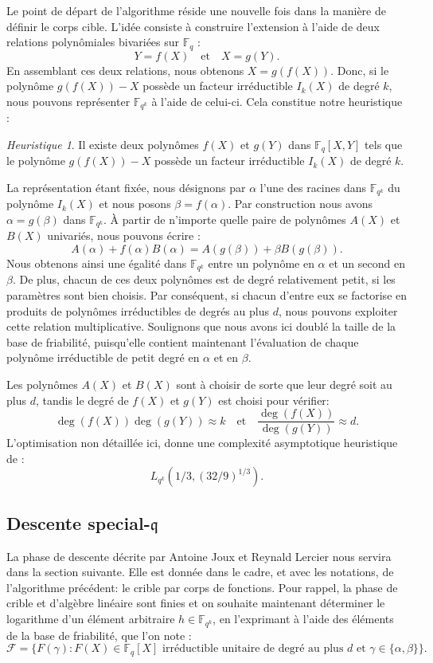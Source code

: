 \documentclass[a4paper, titlepage, 11pt]{article}
\theoremstyle{definition}
\theoremstyle{remark}
\newtheorem{heur}[theo]{Heuristique}
\def\gf #1{\mathbb{F}_{#1}}
\begin{document}
Le point de départ de l'algorithme réside une nouvelle fois dans la manière de définir le corps cible. L'idée consiste à construire l'extension à l'aide de deux relations polynômiales bivariées sur $\gf{q}$ : $$Y = f(X) \quad \text{et}\quad X = g(Y).$$
En assemblant ces deux relations, nous obtenons $X = g(f(X))$. Donc, si le polynôme $g(f(X)) - X$ possède un facteur irréductible $I_k(X)$ de degré $k$, nous pouvons représenter $\gf{q^k}$ à l'aide de celui-ci. Cela constitue notre heuristique :
\begin{heur}
Il existe deux polynômes $f(X)$ et $g(Y)$ dans $\gf{q}[X, Y]$ tels que le polynôme $g(f(X)) - X$ possède un facteur irréductible $I_k(X)$ de degré $k$.
\end{heur}
La représentation étant fixée, nous désignons par $\alpha$ l'une des racines dans $\gf{q^k}$ du polynôme $I_k(X)$ et nous posons $\beta = f(\alpha)$. Par construction nous avons $\alpha = g(\beta)$ dans $\gf{q^k}$. À partir de n'importe quelle paire de polynômes $A(X)$ et $B(X)$ univariés, nous pouvons écrire :
$$A(\alpha) + f(\alpha)B(\alpha) = A(g(\beta)) + \beta B(g(\beta)).$$
Nous obtenons ainsi une égalité dans $\gf{q^k}$ entre un polynôme en $\alpha$ et un second en $\beta$. De plus, chacun de ces deux polynômes est de degré relativement petit, si les paramètres sont bien choisis. Par conséquent, si chacun d'entre eux se factorise en produits de polynômes irréductibles de degrés au plus $d$, nous pouvons exploiter cette relation multiplicative. Soulignons que nous avons ici doublé la taille de la base de friabilité, puisqu'elle contient maintenant l'évaluation de chaque polynôme irréductible de petit degré en $\alpha$ et en $\beta$.

Les polynômes $A(X)$ et $B(X)$ sont à choisir de sorte que leur degré soit au plus $d$, tandis le degré de $f(X)$ et $g(Y)$ est choisi pour vérifier: $$\deg(f(X)) \deg(g(Y)) \approx k \quad\text{et}\quad \frac{\deg(f(X))}{\deg(g(Y))} \approx d.$$
L'optimisation non détaillée ici, donne une complexité asymptotique heuristique de :
$$L_{q^k}(1/3, (32/9)^{1/3}).$$

\subsection{Descente special-$\mathfrak{q}$}\label{s-sec:special-q}

La phase de descente décrite par Antoine Joux et Reynald Lercier \cite{joux2006, joux2002} nous servira dans la section suivante. Elle est donnée dans le cadre, et avec les notations, de l'algorithme précédent: le crible par corps de fonctions. Pour rappel, la phase de crible et d'algèbre linéaire sont finies et on souhaite maintenant déterminer le logarithme d'un élément arbitraire $h\in\gf{q^k}$, en l'exprimant à l'aide des éléments de la base de friabilité, que l'on note :
$$\mathcal{F} =  \{F(\gamma) : F(X) \in \gf{q}[X] \text{ irréductible unitaire de degré au plus } d \text{ et } \gamma \in \{\alpha, \beta\}\}.$$ 
\end{document}
